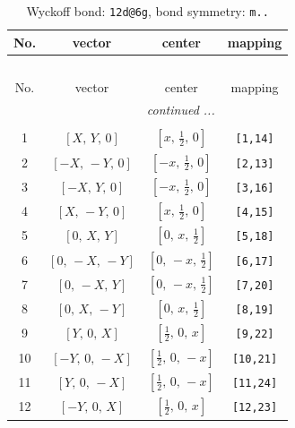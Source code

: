 \documentclass[fleqn,8pt]{jsarticle}
\begin{document}
\begin{longtable}{cccc}
\caption{Wyckoff bond: {\tt 12d@6g}, bond symmetry: {\tt m..}}
 \\
 \hline \hline
No. & vector & center & mapping \\ \hline \endfirsthead

\multicolumn{3}{l}{\tablename\ \thetable{}} \\
 \hline \hline
No. & vector & center & mapping \\ \hline \endhead

 \hline \hline
\multicolumn{3}{r}{\footnotesize\it continued ...} \\ \endfoot

 \hline \hline
\multicolumn{3}{r}{} \\ \endlastfoot

1 & $\left[ X,\, Y,\, 0 \right]$ & $\left[ x,\, \frac{1}{2},\, 0 \right]$ & {\tt [1,14]} \\ \hline
2 & $\left[ - X,\, - Y,\, 0 \right]$ & $\left[ - x,\, \frac{1}{2},\, 0 \right]$ & {\tt [2,13]} \\ \hline
3 & $\left[ - X,\, Y,\, 0 \right]$ & $\left[ - x,\, \frac{1}{2},\, 0 \right]$ & {\tt [3,16]} \\ \hline
4 & $\left[ X,\, - Y,\, 0 \right]$ & $\left[ x,\, \frac{1}{2},\, 0 \right]$ & {\tt [4,15]} \\ \hline
5 & $\left[ 0,\, X,\, Y \right]$ & $\left[ 0,\, x,\, \frac{1}{2} \right]$ & {\tt [5,18]} \\ \hline
6 & $\left[ 0,\, - X,\, - Y \right]$ & $\left[ 0,\, - x,\, \frac{1}{2} \right]$ & {\tt [6,17]} \\ \hline
7 & $\left[ 0,\, - X,\, Y \right]$ & $\left[ 0,\, - x,\, \frac{1}{2} \right]$ & {\tt [7,20]} \\ \hline
8 & $\left[ 0,\, X,\, - Y \right]$ & $\left[ 0,\, x,\, \frac{1}{2} \right]$ & {\tt [8,19]} \\ \hline
9 & $\left[ Y,\, 0,\, X \right]$ & $\left[ \frac{1}{2},\, 0,\, x \right]$ & {\tt [9,22]} \\ \hline
10 & $\left[ - Y,\, 0,\, - X \right]$ & $\left[ \frac{1}{2},\, 0,\, - x \right]$ & {\tt [10,21]} \\ \hline
11 & $\left[ Y,\, 0,\, - X \right]$ & $\left[ \frac{1}{2},\, 0,\, - x \right]$ & {\tt [11,24]} \\ \hline
12 & $\left[ - Y,\, 0,\, X \right]$ & $\left[ \frac{1}{2},\, 0,\, x \right]$ & {\tt [12,23]} \\
\end{longtable}
\end{document}
